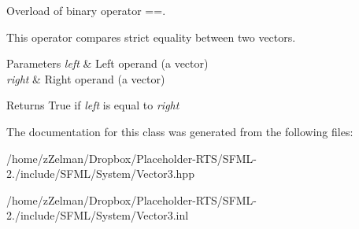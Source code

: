Overload of binary operator ==. 

This operator compares strict equality between two vectors.


\begin{DoxyParams}{Parameters}
{\em left} & Left operand (a vector) \\
\hline
{\em right} & Right operand (a vector)\\
\hline
\end{DoxyParams}
\begin{DoxyReturn}{Returns}
True if {\itshape left} is equal to {\itshape right} 
\end{DoxyReturn}


The documentation for this class was generated from the following files\-:\begin{DoxyCompactItemize}
\item 
/home/z\-Zelman/\-Dropbox/\-Placeholder-\/\-R\-T\-S/\-S\-F\-M\-L-\/2./include/\-S\-F\-M\-L/\-System/Vector3.\-hpp\item 
/home/z\-Zelman/\-Dropbox/\-Placeholder-\/\-R\-T\-S/\-S\-F\-M\-L-\/2./include/\-S\-F\-M\-L/\-System/Vector3.\-inl\end{DoxyCompactItemize}
